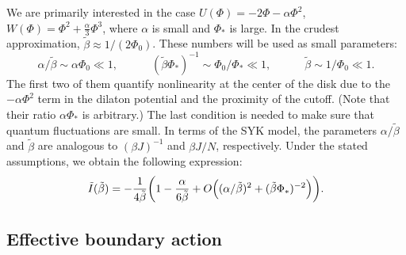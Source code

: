 \documentclass[12pt]{article}
\begin{document}
We are primarily interested in the case $U(\Phi)=-2\Phi-\alpha\Phi^2$,\,\, $W(\Phi)=\Phi^2+\frac{\alpha}{3}\Phi^3$, where $\alpha$ is small and $\Phi_*$ is large. In the crudest approximation, $\tilde{\beta}\approx 1/(2\Phi_0)$. These numbers will be used as small parameters:
\begin{equation}
\alpha/\tilde{\beta} \sim \alpha\Phi_0 \ll 1,\qquad\quad
(\tilde{\beta}\Phi_*)^{-1} \sim \Phi_0/\Phi_* \ll 1,\qquad\quad
\tilde{\beta}\sim 1/\Phi_0\ll 1.
\end{equation}
The first two of them quantify nonlinearity at the center of the disk due to the $-\alpha\Phi^2$ term in the dilaton potential and the proximity of the cutoff. (Note that their ratio $\alpha\Phi_*$ is arbitrary.) The last condition is needed to make sure that quantum fluctuations are small. In terms of the SYK model, the parameters $\alpha/\tilde{\beta}$ and $\tilde{\beta}$ are analogous to $(\beta J)^{-1}$ and $\beta J/N$, respectively. Under the stated assumptions, we obtain the following expression:
\begin{gather}
\label{tI_static}
\tilde{I}(\tilde{\beta}) = -\frac{1}{4\tilde{\beta}}
\biggl(
1-\frac{\alpha}{6\tilde{\beta}}
+O\Bigl((\alpha/\tilde{\beta})^2+(\tilde\beta\Phi_*)^{-2}\Bigr)
\biggr).
\end{gather}

\subsection{Effective boundary action} \label{sec: effbdact}
\end{document}
